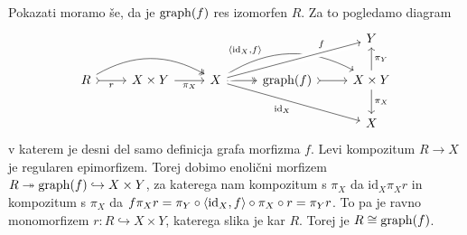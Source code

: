 \documentclass[../kategoricna_logika.tex]{subfiles}
\begin{document}
\begin{dokaz}
\begin{enumerate}[label=(\roman*)]
    Pokazati moramo še, da je $\operatorname{graph}(f)$ res izomorfen $R$. Za to pogledamo diagram
    \begin{equation*}
    \begin{tikzcd}
      & & & & Y \\
      R \ar[r, tail, "r"'] \ar[rr, two heads, bend left] & X \times Y \ar[r, "\pi_X"'] & X \ar[r, two heads]  \ar[rr, bend left, pos=0.3, "\fprod{\mathrm{id}_X, f}"] \ar[urr, crossing over, pos=0.75, "f"] \ar[drr, "\mathrm{id}_X"']  & \operatorname{graph}(f) \ar[r, tail] & X \times Y \ar[d, "\pi_X"] \ar[u, "\pi_Y"'] \\
      & & & & X
    \end{tikzcd}
    \end{equation*}
    v katerem je desni del samo definicja grafa morfizma $f$.
    Levi kompozitum $R \to X$ je regularen epimorfizem.
    Torej dobimo enolični morfizem $R \twoheadrightarrow \operatorname{graph}(f) \hookrightarrow X \times Y$,
    za katerega nam kompozitum s $\pi_X$ da $\mathrm{id}_X \pi_X r$ in kompozitum s $\pi_X$ da 
    $f \pi_X r = \pi_Y \circ \langle \mathrm{id}_X, f \rangle \circ \pi_X \circ r = \pi_Y r$.
    To pa je ravno monomorfizem $r : R \hookrightarrow X \times Y$, katerega slika je kar $R$.
    Torej je $R \cong \operatorname{graph}(f)$.
\end{enumerate}
\end{dokaz}
\end{document}
